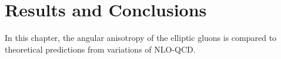 
\chapter{Results and Conclusions}

In this chapter, the angular anisotropy of the elliptic gluons is compared to theoretical predictions from variations of NLO-QCD.